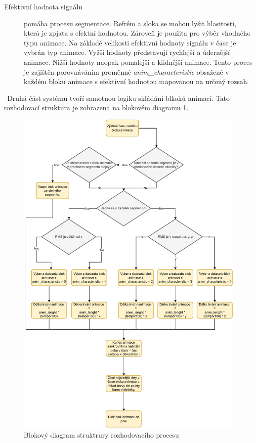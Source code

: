 \begin{description}
    \item[Efektivní hodnota signálu] pomáha procesu segmentace. Refrém a sloka se mohou lyšit hlasitostí, která je zpjata s efektní hodnotou. Zároveň je použita pro výběr vhodného typu animace. Na základě velikosti efektivní hodnoty signálu v čase je vybrán typ animace. Vyžší hodnoty představují rychlejší a údernější animace. Nižší hodnoty naopak pomalejší a klidnější animace. Tento proces je zajištěn porovnáváním proměnné \textit{anim\_characteristic} obsažené v každém bloku animace s efektivní hodnotou mapovanou na určený rozsah.
\end{description}

\
Druhá část systému tvoří samotnou logiku skládání blkoků animací. Tato rozhodovací struktura je zobrazena na blokovém diagramu \ref{fig:Logical_structure_diagram}.

\begin{figure}[H]
    \centering
    \includegraphics[width = 1\linewidth]{obrazky/Logical_structure_diagram.pdf}
    \caption{Blokový diagram struktrury rozhodovacího procesu}
    \label{fig:Logical_structure_diagram}
\end{figure}

